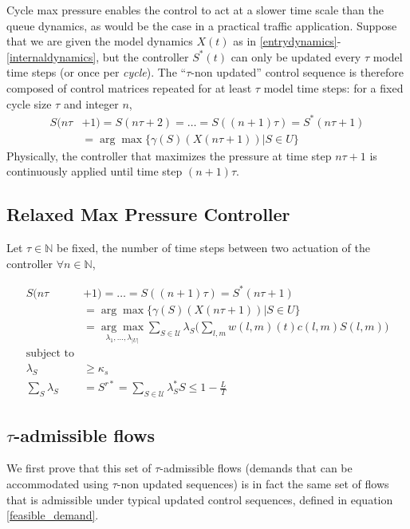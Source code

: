 Cycle max pressure enables the control to act at a slower time scale than the queue dynamics, as would be the case in a practical traffic application. Suppose that we are given the model dynamics $X(t)$ as in \eqref{entrydynamics}-\eqref{internaldynamics}, but the controller $S^*(t)$ can only be updated every $\tau$ model time steps (or once per \emph{cycle}). The ``$\tau$-non updated'' control sequence is therefore composed of control matrices repeated for at least $\tau$ model time steps: for a fixed cycle size $\tau$ and integer $n$, 
\begin{align} \nonumber
S(n\tau&+1)  = S(n\tau +2) = \ldots = S((n+1)\tau ) = S^*(n\tau +1) \\
&=  \arg\max\{\gamma(S)(X(n\tau +1 )) \vert S \in U\}  
 \label{CYCLE_CONTROLLER}
\end{align}
Physically, the controller that maximizes the pressure at time step $n\tau + 1$ is continuously applied until time step $(n + 1)\tau$.

\subsection*{Relaxed Max Pressure Controller}

Let $\tau \in \mathbb{N}$ be fixed, the number of time steps between two actuation of the controller
$\forall n \in \mathbb{N}$, 

\begin{align} \nonumber
S(n\tau&+1)   = \ldots = S((n+1)\tau ) = S^*(n\tau +1) \\
&=  \arg\max\{\gamma(S)(X(n\tau +1 )) \vert S \in U\}  \\
& =  \underset{\lambda_{1},...,\lambda_{\vert U\vert}}{ \arg \max}  \sum_{S \in \mathcal{U}}\lambda_{S}\Big(\sum_{l,m} w(l,m)(t)c(l,m) S(l,m)\Big)  \\
\nonumber  \text{subject to}\\
\nonumber    \lambda_{S} & \geq \kappa_s\\
 \sum_{S} \lambda_{S} &  = S^{r*} = \displaystyle\sum_{S \in \mathcal{U}}\lambda_{S}^{*}S \leq 1 - \tfrac{L}{T}  \label{distMP_LP} 
\end{align}





\subsection*{$\tau$-admissible flows}
We first prove that this set of $\tau$-admissible flows (demands that can be accommodated using $\tau$-non updated sequences) is in fact the same set of flows that is admissible under typical updated control sequences, defined in equation \eqref{feasible_demand}. 

